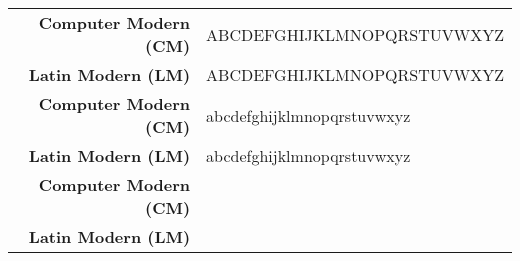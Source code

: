 \documentclass{unittest}
\newcommand{\cmfont}{\fontfamily{cmr}\selectfont}
\newcommand{\lmfont}{\fontfamily{ugq}\selectfont}
\newcommand{\UpperAlphabet}{ABCDEFGHIJKLMNOPQRSTUVWXYZ}
\newcommand{\LowerAlphabet}{abcdefghijklmnopqrstuvwxyz}
\newcommand{\Digits}{0123456789}
\begin{document}
\begin{tabular}{rl}
\toprule
	\textbf{Computer Modern (CM)} & {\cmfont \UpperAlphabet}
\\	\textbf{Latin Modern (LM)} & {\lmfont \UpperAlphabet}
\\	\textbf{Computer Modern (CM)} & {\cmfont \LowerAlphabet}
\\	\textbf{Latin Modern (LM)} & {\lmfont \LowerAlphabet}
\\	\textbf{Computer Modern (CM)} & {\cmfont \Digits}
\\	\textbf{Latin Modern (LM)} & {\lmfont \Digits}
\\ \bottomrule
\end{tabular}
\end{document}
